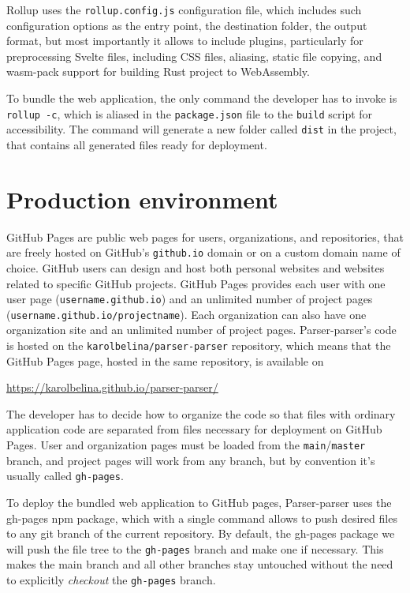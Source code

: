 \documentclass[english,bachelors,forcepolishlogotype]{wizthesis}
\newcommand{\thisproject}{Parser-parser}
\begin{document}
Rollup uses the \texttt{rollup.config.js} configuration file, which includes
such configuration options as the entry point, the destination folder, the
output format, but most importantly it allows to include plugins, particularly
for preprocessing Svelte files, including CSS files, aliasing, static file
copying, and wasm-pack support for building Rust project to WebAssembly.

To bundle the web application, the only command the developer has to invoke is
\texttt{rollup -c}, which is aliased in the \texttt{package.json} file to the
\texttt{build} script for accessibility. The command will generate a new folder
called \texttt{dist} in the project, that contains all generated files ready for
deployment.

\section{Production environment}

GitHub Pages are public web pages for users, organizations, and repositories,
that are freely hosted on GitHub's \texttt{github.io} domain or on a custom
domain name of choice. GitHub users can design and host both personal websites
and websites related to specific GitHub projects. GitHub Pages provides each
user with one user page (\texttt{username.github.io}) and an unlimited number of
project pages (\texttt{username.github.io/projectname}). Each organization can
also have one organization site and an unlimited number of project pages.
\thisproject{}'s code is hosted on the \texttt{karolbelina/parser-parser}
repository, which means that the GitHub Pages page, hosted in the same
repository, is available on
\begin{center}
  \url{https://karolbelina.github.io/parser-parser/}
\end{center}
The developer has to decide how to organize the code so that files with ordinary
application code are separated from files necessary for deployment on GitHub
Pages. User and organization pages must be loaded from the
\texttt{main}/\texttt{master} branch, and project pages will work from any
branch, but by convention it's usually called \texttt{gh-pages}.

To deploy the bundled web application to GitHub pages, \thisproject{} uses the
gh-pages npm package, which with a single command allows to push desired files
to any git branch of the current repository. By default, the gh-pages package we
will push the file tree to the \texttt{gh-pages} branch and make one if
necessary. This makes the main branch and all other branches stay untouched
without the need to explicitly \emph{checkout} the \texttt{gh-pages} branch.
\end{document}
